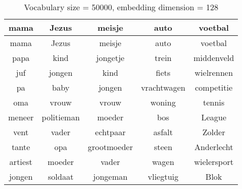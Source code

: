 \begin{table}[H]
\centering
\caption[Vocabulary size = 50000, embedding dimension = 128]{Vocabulary size = 50000, embedding dimension = 128}
\label{tab:emb_experiments}
\begin{tabular}{|c|c|c|c|c|}
\hline
mama & Jezus & meisje & auto & voetbal \\ \hline \hline
mama & Jezus & meisje & auto & voetbal\\
papa & kind & jongetje & trein & middenveld\\
juf & jongen & kind & fiets & wielrennen\\
pa & baby & jongen & vrachtwagen & competitie\\
oma & vrouw & vrouw & woning & tennis\\
meneer & politieman & moeder & bos & League\\
vent & vader & echtpaar & asfalt & Zolder\\
tante & opa & grootmoeder & steen & Anderlecht\\
artiest & moeder & vader & wagen & wielersport\\
jongen & soldaat & jongeman & vliegtuig & Blok\\
\hline
\end{tabular}
\end{table}
